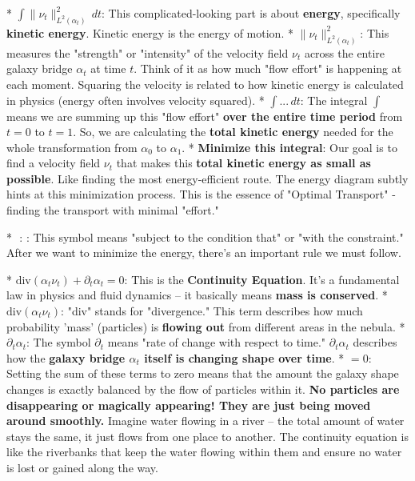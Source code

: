 \documentclass{article}
\begin{document}
*   \textbf{\( \int \|\nu_t\|_{L^2(\alpha_t)}^2 \, dt \)}: This complicated-looking part is about \textbf{energy}, specifically \textbf{kinetic energy}.  Kinetic energy is the energy of motion.
    *   \textbf{\( \|\nu_t\|_{L^2(\alpha_t)}^2 \)}:  This measures the "strength" or "intensity" of the velocity field \( \nu_t \) across the entire galaxy bridge \( \alpha_t \) at time \( t \). Think of it as how much "flow effort" is happening at each moment.  Squaring the velocity is related to how kinetic energy is calculated in physics (energy often involves velocity squared).
    *   \textbf{\( \int ... \, dt \)}: The integral \( \int \) means we are summing up this "flow effort" \textbf{over the entire time period} from \( t=0 \) to \( t=1 \). So, we are calculating the \textbf{total kinetic energy} needed for the whole transformation from \( \alpha_0 \) to \( \alpha_1 \).
    *   \textbf{Minimize this integral}:  Our goal is to find a velocity field \( \nu_t \) that makes this \textbf{total kinetic energy as small as possible}.  Like finding the most energy-efficient route.  The energy diagram subtly hints at this minimization process.  This is the essence of "Optimal Transport" - finding the transport with minimal "effort."

*   \textbf{\( \text{ : } \)}: This symbol means "subject to the condition that" or "with the constraint."  After we want to minimize the energy, there's an important rule we must follow.

*   \textbf{\( \text{div}(\alpha_t \nu_t) + \partial_t \alpha_t = 0 \)}:  This is the \textbf{Continuity Equation}.  It's a fundamental law in physics and fluid dynamics – it basically means \textbf{mass is conserved}.
    *   \textbf{\( \text{div}(\alpha_t \nu_t) \)}:  "div" stands for "divergence."  This term describes how much probability 'mass' (particles) is \textbf{flowing out} from different areas in the nebula.
    *   \textbf{\( \partial_t \alpha_t \)}: The symbol \( \partial_t \) means "rate of change with respect to time."  \( \partial_t \alpha_t \) describes how the \textbf{galaxy bridge \( \alpha_t \) itself is changing shape over time}.
    *   \textbf{\( = 0 \)}:  Setting the sum of these terms to zero means that the amount the galaxy shape changes is exactly balanced by the flow of particles within it.  \textbf{No particles are disappearing or magically appearing!  They are just being moved around smoothly.}  Imagine water flowing in a river – the total amount of water stays the same, it just flows from one place to another.  The continuity equation is like the riverbanks that keep the water flowing within them and ensure no water is lost or gained along the way.
\end{document}
